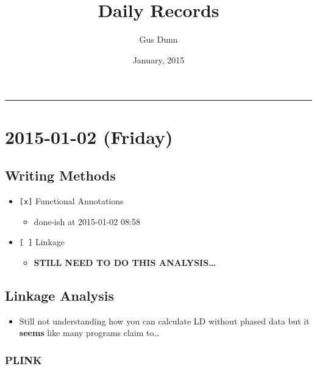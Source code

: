 \documentclass[letterpaper]{scrartcl}
\title{Daily Records\\\vspace{0.5em}{\large Caccone PostDoc}}
\author{Gus Dunn}
\date{January, 2015}
\begin{document}
\maketitle

{
\hypersetup{linkcolor=black}
\setcounter{tocdepth}{3}
\tableofcontents
}
\begin{center}\rule{0.5\linewidth}{\linethickness}\end{center}

\section{2015-01-02 (Friday)}\label{friday}

\subsection{Writing Methods}\label{writing-methods}

\begin{itemize}
\itemsep1pt\parskip0pt
\item
  \texttt{{[}x{]}} Functional Annotations

  \begin{itemize}
  \itemsep1pt\parskip0pt
  \item
    done-ish at 2015-01-02 08:58
  \end{itemize}
\item
  \texttt{{[} {]}} Linkage

  \begin{itemize}
  \itemsep1pt\parskip0pt
  \item
    \textbf{STILL NEED TO DO THIS ANALYSIS\ldots{}}
  \end{itemize}
\end{itemize}

\subsection{Linkage Analysis}\label{linkage-analysis}

\begin{itemize}
\itemsep1pt\parskip0pt
\item
  Still not understanding how you can calculate LD without phased data
  but it \textbf{seems} like many programs claim to\ldots{}
\end{itemize}

\subsubsection{PLINK}\label{plink}
\end{document}
